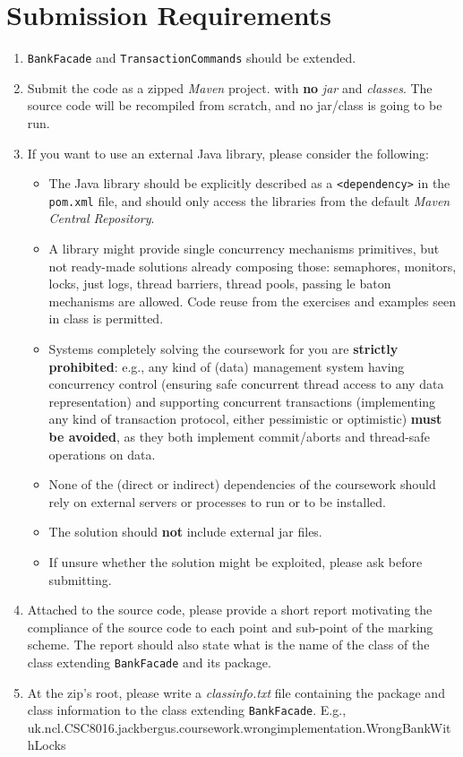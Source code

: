 \documentclass{article}
\begin{document}
	\section*{Submission Requirements}
	\begin{enumerate}
		\item \texttt{BankFacade} and \texttt{TransactionCommands} should be extended.
		\item Submit the code as a zipped \textit{Maven} project. with \textbf{no} \textit{jar} and \textit{classes}. The source code will be recompiled from scratch, and no jar/class is going to be run.
		 
		\item If you want to use an external Java library, please consider the following:
		\begin{itemize}
			\item The Java library should be explicitly described as a \texttt{<dependency>} in the \texttt{pom.xml} file, and should only access the libraries from the default \textit{Maven Central Repository}.
			\item A library might provide single concurrency mechanisms primitives, but not ready-made solutions already composing those: semaphores, monitors, locks, just logs, thread barriers, thread pools, passing le baton mechanisms are allowed. Code reuse from the exercises and examples seen in class is permitted.
			
			\item Systems completely solving the coursework for you are \textbf{strictly prohibited}: e.g., any kind of (data) management system having concurrency control (ensuring safe concurrent thread access to any data representation) and supporting concurrent transactions (implementing any kind of transaction protocol, either pessimistic or optimistic) \textbf{must be avoided}, as they both implement commit/aborts and thread-safe operations on data. 
			\item None of the (direct or indirect) dependencies of the coursework should rely on external servers or processes to run or to be installed.
			\item The solution should \textbf{not} include external jar files.
			\item If unsure whether the solution might be exploited, please ask before submitting.
		\end{itemize}
		 
		\item Attached to the source code, please provide a short report motivating the compliance of the source code to each point and sub-point of the marking scheme. The report should also state what is the name of the class of the class extending \texttt{BankFacade} and its package.
		
		\item At the zip's root, please write a \textit{classinfo.txt} file containing the package and class information to the class extending \texttt{BankFacade}. E.g., \\
		
		uk.ncl.CSC8016.jackbergus.coursework.wrongimplementation.WrongBankWithLocks

	\end{enumerate}
\end{document}
